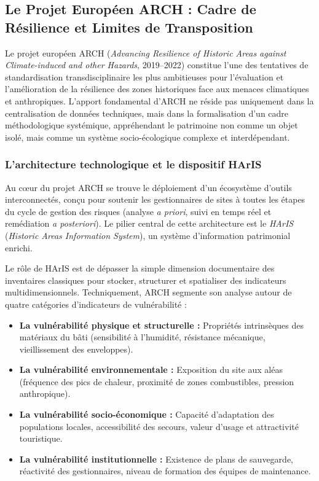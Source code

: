 \documentclass{article}
\begin{document}
\subsection{Le Projet Européen ARCH : Cadre de Résilience et Limites de Transposition}
\label{subsec:arch_project_approfondi}

Le projet européen ARCH (\textit{Advancing Resilience of Historic Areas against Climate-induced and other Hazards}, 2019--2022) constitue l'une des tentatives de standardisation transdisciplinaire les plus ambitieuses pour l'évaluation et l'amélioration de la résilience des zones historiques face aux menaces climatiques et anthropiques. L'apport fondamental d'ARCH ne réside pas uniquement dans la centralisation de données techniques, mais dans la formalisation d'un cadre méthodologique systémique, appréhendant le patrimoine non comme un objet isolé, mais comme un système socio-écologique complexe et interdépendant.

\subsubsection{L'architecture technologique et le dispositif HArIS}

Au cœur du projet ARCH se trouve le déploiement d'un écosystème d'outils interconnectés, conçu pour soutenir les gestionnaires de sites à toutes les étapes du cycle de gestion des risques (analyse \textit{a priori}, suivi en temps réel et remédiation \textit{a posteriori}). Le pilier central de cette architecture est le \textit{HArIS} (\textit{Historic Areas Information System}), un système d'information patrimonial enrichi. 

Le rôle de HArIS est de dépasser la simple dimension documentaire des inventaires classiques pour stocker, structurer et spatialiser des indicateurs multidimensionnels. Techniquement, ARCH segmente son analyse autour de quatre catégories d'indicateurs de vulnérabilité :
\begin{itemize}
    \item \textbf{La vulnérabilité physique et structurelle :} Propriétés intrinsèques des matériaux du bâti (sensibilité à l'humidité, résistance mécanique, vieillissement des enveloppes).
    \item \textbf{La vulnérabilité environnementale :} Exposition du site aux aléas (fréquence des pics de chaleur, proximité de zones combustibles, pression anthropique).
    \item \textbf{La vulnérabilité socio-économique :} Capacité d'adaptation des populations locales, accessibilité des secours, valeur d'usage et attractivité touristique.
    \item \textbf{La vulnérabilité institutionnelle :} Existence de plans de sauvegarde, réactivité des gestionnaires, niveau de formation des équipes de maintenance.
\end{itemize}
\end{document}
